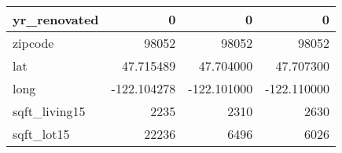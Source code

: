 \begin{table}[H]
\begin{tabular}{|l|r|r|r|}
\hline yr\_renovated & \cellcolor[rgb]{0.9, 0.54, 0.52} 0 & \cellcolor[rgb]{0.9, 0.54, 0.52} 0 & \cellcolor[rgb]{0.9, 0.54, 0.52} 0 \\
\hline zipcode & \cellcolor[rgb]{0.9, 0.54, 0.52} 98052 & \cellcolor[rgb]{0.9, 0.54, 0.52} 98052 & \cellcolor[rgb]{0.9, 0.54, 0.52} 98052 \\
\hline lat & \cellcolor[rgb]{0.9, 0.54, 0.52} 47.715489 & 47.704000 & 47.707300 \\
\hline long & \cellcolor[rgb]{0.9, 0.54, 0.52} -122.104278 & \cellcolor[rgb]{0.9, 0.54, 0.52} -122.101000 & \cellcolor[rgb]{0.9, 0.54, 0.52} -122.110000 \\
\hline sqft\_living15 & \cellcolor[rgb]{0.9, 0.54, 0.52} 2235 & 2310 & 2630 \\
\hline sqft\_lot15 & \cellcolor[rgb]{0.9, 0.54, 0.52} 22236 & 6496 & 6026 \\
\hline
\end{tabular}
\end{table}
